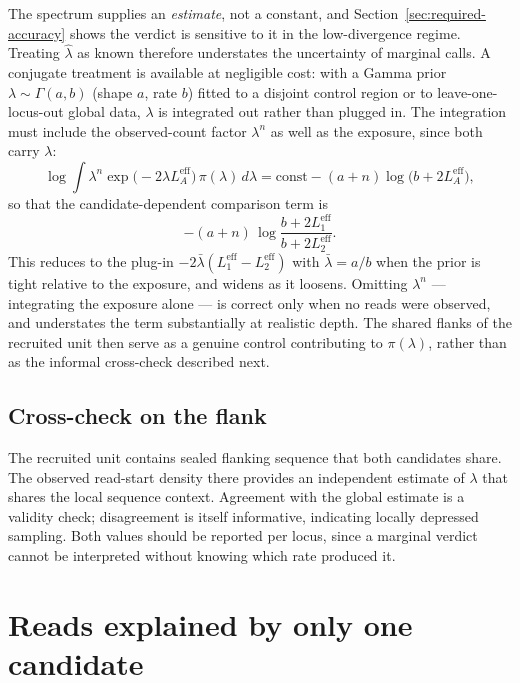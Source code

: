 \documentclass[11pt]{article}
\begin{document}
The spectrum supplies an \emph{estimate}, not a constant, and
Section~\ref{sec:required-accuracy} shows the verdict is sensitive to it in the
low-divergence regime.  Treating $\hat\lambda$ as known therefore understates
the uncertainty of marginal calls.  A conjugate treatment is available at
negligible cost: with a Gamma prior $\lambda \sim \Gamma(a,b)$ (shape $a$, rate
$b$) fitted to a disjoint control region or to leave-one-locus-out global data,
$\lambda$ is integrated out rather than plugged in.  The integration must
include the observed-count factor $\lambda^n$ as well as the exposure, since
both carry $\lambda$:
\begin{equation}
    \log \int \lambda^{n}\exp\!\big(-2\lambda L_A^{\mathrm{eff}}\big)\,
      \pi(\lambda)\,d\lambda
    = \text{const} - (a+n)\log\!\big(b + 2L_A^{\mathrm{eff}}\big),
\end{equation}
so that the candidate-dependent comparison term is
\begin{equation}
    -(a+n)\,\log\frac{b+2L_1^{\mathrm{eff}}}{b+2L_2^{\mathrm{eff}}} .
\label{eq:gamma-term}
\end{equation}
This reduces to the plug-in $-2\bar\lambda(L_1^{\mathrm{eff}}-L_2^{\mathrm{eff}})$
with $\bar\lambda = a/b$ when the prior is tight relative to the exposure, and
widens as it loosens.  Omitting $\lambda^n$ --- integrating the exposure alone
--- is correct only when no reads were observed, and understates the term
substantially at realistic depth.  The shared flanks of the
recruited unit then serve as a genuine control contributing to $\pi(\lambda)$,
rather than as the informal cross-check described next.

\subsection{Cross-check on the flank}

The recruited unit contains sealed flanking sequence that both candidates share.
The observed read-start density there provides an independent estimate of
$\lambda$ that shares the local sequence context.  Agreement with the global
estimate is a validity check; disagreement is itself informative, indicating
locally depressed sampling.  Both values should be reported per locus, since a
marginal verdict cannot be interpreted without knowing which rate produced it.

\section{Reads explained by only one candidate}
\label{sec:truncation}
\end{document}
